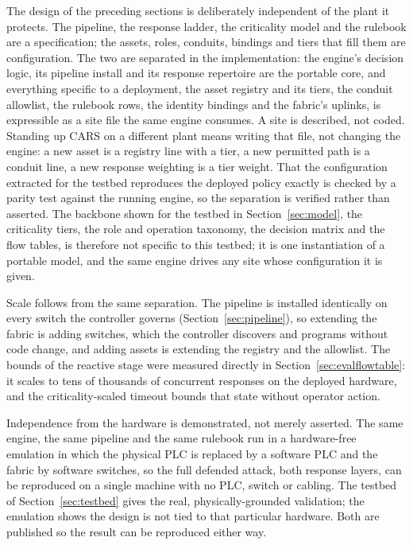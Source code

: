 The design of the preceding sections is deliberately independent of the plant it protects. The pipeline, the response ladder, the criticality model and the rulebook are a specification; the assets, roles, conduits, bindings and tiers that fill them are configuration. The two are separated in the implementation: the engine's decision logic, its pipeline install and its response repertoire are the portable core, and everything specific to a deployment, the asset registry and its tiers, the conduit allowlist, the rulebook rows, the identity bindings and the fabric's uplinks, is expressible as a site file the same engine consumes. A site is described, not coded. Standing up CARS on a different plant means writing that file, not changing the engine: a new asset is a registry line with a tier, a new permitted path is a conduit line, a new response weighting is a tier weight. That the configuration extracted for the testbed reproduces the deployed policy exactly is checked by a parity test against the running engine, so the separation is verified rather than asserted. The backbone shown for the testbed in Section~\ref{sec:model}, the criticality tiers, the role and operation taxonomy, the decision matrix and the flow tables, is therefore not specific to this testbed; it is one instantiation of a portable model, and the same engine drives any site whose configuration it is given.

Scale follows from the same separation. The pipeline is installed identically on every switch the controller governs (Section~\ref{sec:pipeline}), so extending the fabric is adding switches, which the controller discovers and programs without code change, and adding assets is extending the registry and the allowlist. The bounds of the reactive stage were measured directly in Section~\ref{sec:evalflowtable}: it scales to tens of thousands of concurrent responses on the deployed hardware, and the criticality-scaled timeout bounds that state without operator action.

Independence from the hardware is demonstrated, not merely asserted. The same engine, the same pipeline and the same rulebook run in a hardware-free emulation in which the physical PLC is replaced by a software PLC and the fabric by software switches, so the full defended attack, both response layers, can be reproduced on a single machine with no PLC, switch or cabling. The testbed of Section~\ref{sec:testbed} gives the real, physically-grounded validation; the emulation shows the design is not tied to that particular hardware. Both are published so the result can be reproduced either way.

